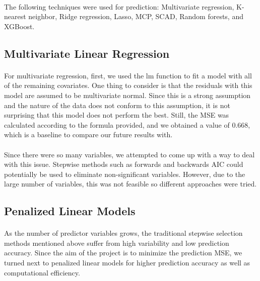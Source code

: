 \documentclass[paper=a4, fontsize=11pt]{scrartcl} %
\numberwithin{equation}{section} %
\numberwithin{figure}{section} %
\numberwithin{table}{section} %
\begin{document}
\paragraph{}
 The following techniques were used for prediction: Multivariate regression, K-nearest neighbor, Ridge regression, Lasso, MCP, SCAD, Random forests, and XGBoost.

\subsection{Multivariate Linear Regression}
\paragraph{}
 For multivariate regression, first, we used the lm function to fit a model with
all of the remaining covariates. One thing to consider is that the residuals with this model are assumed to be multivariate normal. Since this is a strong assumption and the nature of the data does not conform to this assumption, it is not surprising that this model does not perform the best. Still, the MSE was calculated according to the formula provided, and we obtained a value of 0.668, which is a baseline to compare our future results with.

\paragraph{}
Since there were so many variables, we attempted to come up with a way to
deal with this issue. Stepwise methods such as forwards and backwards AIC could potentially be used to eliminate non-significant variables. However, due to the large number of variables, this was not feasible so different approaches were tried.


\subsection{Penalized Linear Models}

\paragraph{}
 As the number of predictor variables grows, the traditional stepwise selection methods mentioned above suffer from high variability and low prediction accuracy. Since the aim of the project is to minimize the prediction MSE, we turned next to penalized linear models for higher prediction accuracy as well as computational efficiency.
\end{document}
